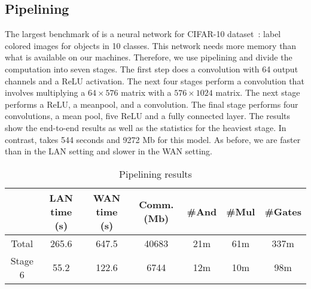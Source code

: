 \subsection{Pipelining}
The largest benchmark of \minion is a neural network for CIFAR-10 dataset~\cite{cifar}: label colored images for objects in 10 classes. This network needs more memory than what is available
on our machines. Therefore, we use pipelining and divide the computation into seven stages.
The first step does a convolution with 64 output channels and a ReLU activation.
The next four stages perform a convolution that involves multiplying a $64\times 576$ matrix with a
$576\times 1024$ matrix. The next stage performs a ReLU, a meanpool, and a convolution.
The final stage performs four convolutions, a mean pool, five ReLU and a fully connected layer.
The results show the end-to-end results as well as the statistics for the heaviest stage.
In contrast, \minion takes 544 seconds and 9272 Mb for this model. As before, we are faster than
\minion in the LAN setting and slower in the WAN setting.

\begin{table*}
\begin{tabular}{c|c|c|c |c|c|c}
           &  LAN time (s) & WAN time (s) & Comm. (Mb)  & \#And & \#Mul & \#Gates \\
\hline
Total      &  265.6       & 647.5        & 40683       & 21m    & 61m    &  337m  \\
\hline
Stage 6    &  55.2        & 122.6        & 6744        & 12m    & 10m   &  98m  \\
\hline
\end{tabular}

 \caption{Pipelining results}
 \label{tab:cifar} 
\end{table*}

